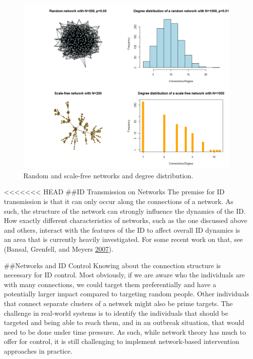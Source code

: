 \documentclass[]{book}
\theoremstyle{definition}
\theoremstyle{definition}
\theoremstyle{definition}
\theoremstyle{remark}
\begin{document}
\begin{figure}
\centering
\includegraphics{./images/network-examples.png}
\caption{\label{fig:network-examples}Random and scale-free networks and
degree distribution.}
\end{figure}

<<<<<<< HEAD
\#\#ID Transmission on Networks The premise for ID transmission is that
it can only occur along the connections of a network. As such, the
structure of the network can strongly influence the dynamics of the ID.
How exactly different characteristics of networks, such as the one
discussed above and others, interact with the features of the ID to
affect overall ID dynamics is an area that is currently heavily
investigated. For some recent work on that, see (Bansal, Grenfell, and
Meyers \protect\hyperlink{ref-bansal07}{2007}).

\#\#Networks and ID Control Knowing about the connection structure is
necessary for ID control. Most obviously, if we are aware who the
individuals are with many connections, we could target them
preferentially and have a potentially larger impact compared to
targeting random people. Other individuals that connect separate
clusters of a network might also be prime targets. The challenge in
real-world systems is to identify the individuals that should be
targeted and being able to reach them, and in an outbreak situation,
that would need to be done under time pressure. As such, while network
theory has much to offer for control, it is still challenging to
implement network-based intervention approaches in practice.
\end{document}
